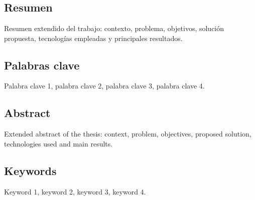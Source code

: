 \chapter{}

\section{Resumen}

Resumen extendido del trabajo: contexto, problema, objetivos, solución
propuesta, tecnologías empleadas y principales resultados.
%
%

\section{Palabras clave}

Palabra clave 1, palabra clave 2, palabra clave 3, palabra clave 4.
\newpage
\section{Abstract}

\begin{otherlanguage}{english}
Extended abstract of the thesis: context, problem, objectives, proposed
solution, technologies used and main results.
\end{otherlanguage}

\section{Keywords}

\begin{otherlanguage}{english}
Keyword 1, keyword 2, keyword 3, keyword 4.
\end{otherlanguage}

